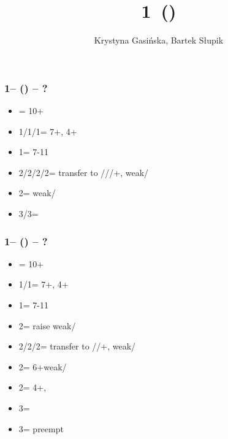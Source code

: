 \documentclass[12pt, a4paper]{article}
\title{1\minor\ (\dbl)}
\author{Krystyna Gasińska, Bartek Słupik}
\begin{document}
\maketitle


\begin{bidpage}
\subsubsection*{1\clubs -- (\dbl) -- ?}
\begin{itemize}
    \item \rdbl = 10+
    \item 1\diams/1\hearts/1\spades = 7+\hcp, 4+
    \item 1\nt = 7-11
    \item 2\clubs/2\diams/2\hearts/2\spades = transfer to \diams/\hearts/\spades/+, weak/\gf
    \item 2\nt = \minor weak/\gf
    \item 3\clubs/3\diams = \inv
\end{itemize}
\end{bidpage}

\begin{bidpage}
\subsubsection*{1\diams -- (\dbl) -- ?}
\begin{itemize}
    \item \rdbl = 10+
    \item 1\hearts/1\spades = 7+\hcp, 4+
    \item 1\nt = 7-11
    \item 2\clubs = \diams raise weak/\gf
    \item 2\diams/2\hearts/2\spades = transfer to \hearts/\spades/+, weak/\gf
    \item 2\spades = 6+\clubs weak/\gf
    \item 2\nt = 4+\diams, \invp
    \item 3\clubs = \inv
    \item 3\diams = preempt
\end{itemize}
\end{bidpage}

\end{document}
